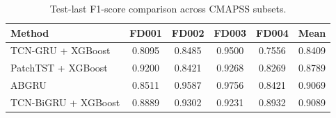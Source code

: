 \begin{table}[!t]
\centering
\caption{Test-last F1-score comparison across CMAPSS subsets.}
\label{tab:method\_comparison\_f1}
\begin{tabular}{lccccc}
\hline
Method & FD001 & FD002 & FD003 & FD004 & Mean \\
\hline
TCN-GRU + XGBoost & 0.8095 & 0.8485 & 0.9500 & 0.7556 & 0.8409 \\
PatchTST + XGBoost & 0.9200 & 0.8421 & 0.9268 & 0.8269 & 0.8789 \\
ABGRU & 0.8511 & 0.9587 & 0.9756 & 0.8421 & 0.9069 \\
TCN-BiGRU + XGBoost & 0.8889 & 0.9302 & 0.9231 & 0.8932 & 0.9089 \\
\hline
\end{tabular}
\end{table}
